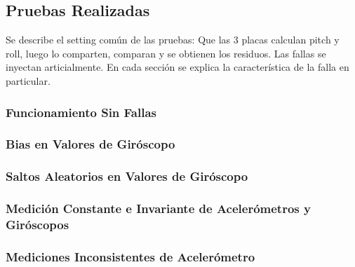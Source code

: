 \subsection{Pruebas Realizadas}

Se describe el setting común de las pruebas: Que las 3 placas calculan pitch y roll, luego lo comparten, comparan y se obtienen los residuos. Las fallas se inyectan articialmente. En cada sección se explica la característica de la falla en particular.

\subsubsection{Funcionamiento Sin Fallas}

\subsubsection{Bias en Valores de Giróscopo}

\subsubsection{Saltos Aleatorios en Valores de Giróscopo}

\subsubsection{Medición Constante e Invariante de Acelerómetros y Giróscopos}

\subsubsection{Mediciones Inconsistentes de Acelerómetro}







